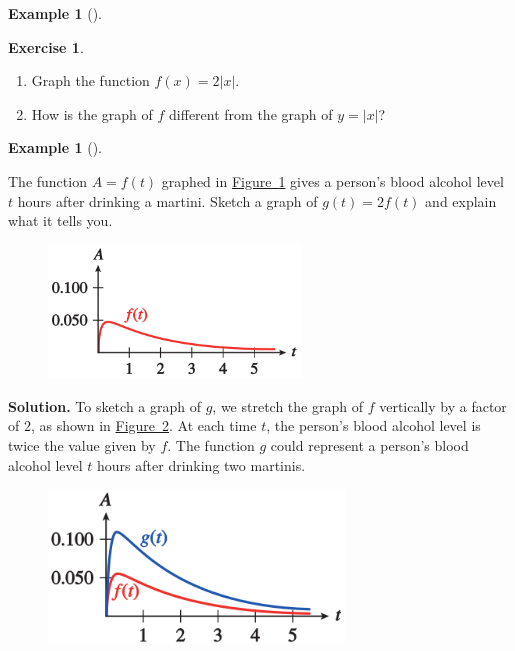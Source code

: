 \documentclass[10pt,]{book}
\theoremstyle{plain}
\theoremstyle{definition}
\newtheorem{exercise}[theorem]{Exercise}
\theoremstyle{definition}
\newtheorem{example}[theorem]{Example}
\numberwithin{equation}{section}
\newcommand\abs[1]{\left|#1\right|}
\begin{document}
\begin{example}[]
\begin{enumerate}[label=*\alph**]
\begin{figure}
\end{figure}
\end{enumerate}
\end{example}
\begin{exercise}\label{scale-abs}
\leavevmode%
\begin{enumerate}[label=*\alph**]
\item\hypertarget{li-315}{}Graph the function \(f (x) = 2\abs{x}\).\item\hypertarget{li-316}{}How is the graph of \(f\) different from the graph of \(y =\abs{x}\)?\end{enumerate}
\end{exercise}
\begin{example}[]\label{example-alcohol-level}

        The function \(A = f (t)\) graphed in \hyperref[fig-surge-alcohol]{Figure~\ref{fig-surge-alcohol}} gives a person's blood alcohol level \(t\) hours after drinking a martini. Sketch a graph of \(g(t) = 2 f (t)\) and explain what it tells you.
\leavevmode%
\begin{figure}
\centering
\includegraphics[width=0.60\textwidth,]{images/fig-surge-alcohol.svg}\caption{\label{fig-surge-alcohol}}
\end{figure}
\par\medskip\noindent%
\textbf{Solution.}\quad 
            To sketch a graph of \(g\), we stretch the graph of \(f\) vertically by a factor of \(2\), as shown in \hyperref[fig-surge-alcohol2]{Figure~\ref{fig-surge-alcohol2}}. At each time \(t\), the person’s blood alcohol level is twice the value given by \(f\). The function \(g\) could represent a person's blood alcohol level \(t\) hours after drinking two martinis.
\leavevmode%
\begin{figure}
\centering
\includegraphics[width=0.70\textwidth,]{images/fig-surge-alcohol2.svg}\caption{\label{fig-surge-alcohol2}}
\end{figure}
\end{example}
\end{document}
